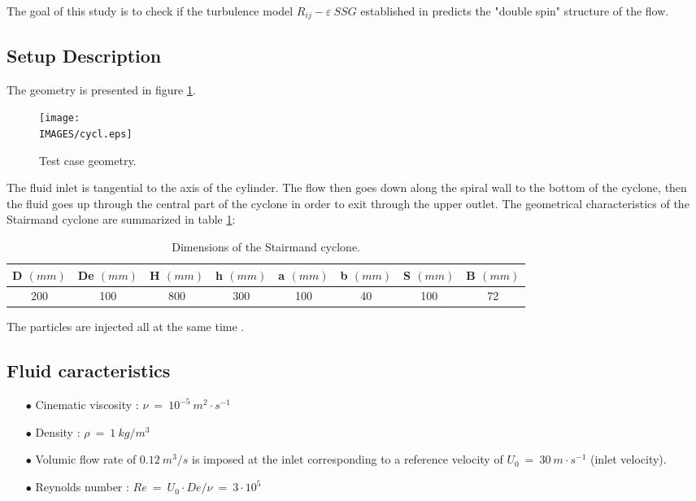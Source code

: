 The goal of this study is to check if the turbulence model $R_{ij}-\varepsilon~SSG$ established in \CS predicts the "double spin" structure of the flow.


\subsection{Setup Description}


The geometry is presented in figure \ref{schema}.

\begin{figure}[H]
   \centerline{\texttt{[image: \\IMAGES/cycl.eps]}}
   \caption{Test case geometry.}
   \label{schema}
\end{figure}

The fluid inlet is tangential to the axis of the cylinder. The flow then goes down along the
spiral wall to the bottom of the cyclone, then the fluid goes up through the central part of the cyclone in order to
exit through the upper outlet. The geometrical characteristics of the Stairmand cyclone are summarized
in table \ref{fig2_cycl}:


\begin{table}[!h]
\begin{center}
\begin{tabular}{|c|c|c|c|c|c|c|c|}
\hline
D $(mm)$ & De $(mm)$ & H $(mm)$ & h $(mm)$ & a $(mm)$ & b $(mm)$ & S $(mm)$ & B $(mm)$ \\
\hline
200 & 100 & 800 & 300 & 100 & 40 & 100 & 72 \\
\hline
\end{tabular}
\end{center}
\caption{Dimensions of the Stairmand cyclone. }
\label{fig2_cycl}
\end{table}

The particles are injected all at the same time \cite{Peirano}. 

\subsection{Fluid caracteristics}

\begin{itemize}
\item[$\bullet$] Cinematic viscosity : $\nu~=~10^{-5}~m^2\cdot s^{-1}$
\item[$\bullet$] Density : $\rho~=~1~kg/m^3$
\item[$\bullet$] Volumic flow rate of $0.12~m^3/s$ is imposed at the inlet corresponding to a reference velocity of $U_0~=~30~m\cdot s^{-1}$ (inlet velocity). 
\item[$\bullet$] Reynolds number : $Re~=~U_0\cdot De/\nu~=~3\cdot10^5$
\end{itemize}

